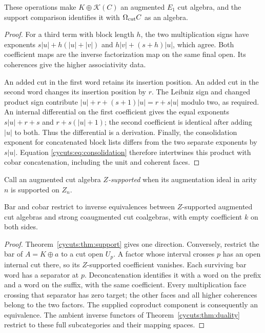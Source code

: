 \begin{proposition}\label{cycuts:prop:resolution-product}
These operations make $K\oplus\mathcal K(C)$ an augmented $E_1$
cut algebra, and the support comparison identifies it with $\Omega_{\mathrm{cut}} C$
as an algebra.
\end{proposition}
\begin{proof}
For a third term with block length $h$, the two multiplication signs
have exponents $s|u|+h(|u|+|v|)$ and $h|v|+(s+h)|u|$, which agree.
Both coefficient maps are the inverse factorization map on the same
final open. Its coherences give the higher associativity data.

An added cut in the first word retains its insertion position.
An added cut in the second word changes its insertion position by
$r$. The Leibniz sign and changed product sign contribute
$|u|+r+(s+1)|u|=r+s|u|$ modulo two, as required. An internal
differential on the first coefficient gives the equal exponents
$s|u|+r+s$ and $r+s(|u|+1)$; the second coefficient is identical
after adding $|u|$ to both. Thus the differential is a derivation.
Finally, the consolidation exponent for concatenated block lists
differs from the two separate exponents by $s|u|$. Equation
\eqref{cycuts:eq:consolidation} therefore intertwines this product
with cobar concatenation, including the unit and coherent faces.
\end{proof}

Call an augmented cut algebra \emph{$Z$-supported} when its
augmentation ideal in arity $n$ is supported on $Z_n$.

\begin{theorem}\label{cycuts:thm:strong}
Bar and cobar restrict to inverse equivalences between $Z$-supported
augmented cut algebras and strong coaugmented cut coalgebras, with
empty coefficient $k$ on both sides.
\end{theorem}
\begin{proof}
Theorem~\ref{cycuts:thm:support} gives one direction. Conversely,
restrict the bar of $A=K\oplus a$ to a cut open $U_p$. A factor
whose interval crosses $p$ has an open internal cut there, so its
$Z$-supported coefficient vanishes. Each surviving bar word has
a separator at $p$. Deconcatenation identifies it with a word on
the prefix and a word on the suffix, with the same coefficient.
Every multiplication face crossing that separator has zero target;
the other faces and all higher coherences belong to the two factors.
The supplied coproduct component is consequently an equivalence.
The ambient inverse functors of Theorem~\ref{cycuts:thm:duality}
restrict to these full subcategories and their mapping spaces.
\end{proof}

